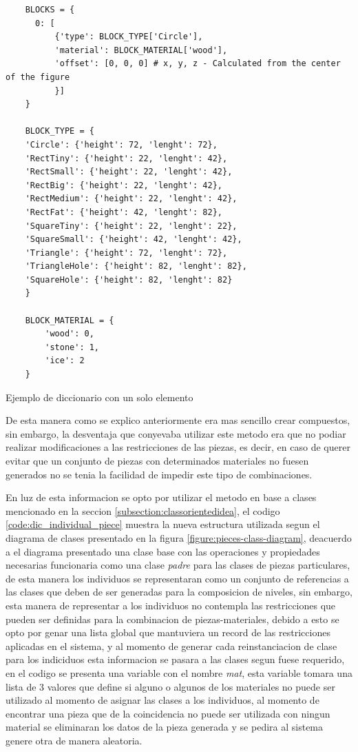 \begin{listing}[t]
  \begin{verbatim}
    BLOCKS = {
      0: [
          {'type': BLOCK_TYPE['Circle'],
          'material': BLOCK_MATERIAL['wood'],
          'offset': [0, 0, 0] # x, y, z - Calculated from the center of the figure
          }]
    }

    BLOCK_TYPE = {
    'Circle': {'height': 72, 'lenght': 72},
    'RectTiny': {'height': 22, 'lenght': 42},
    'RectSmall': {'height': 22, 'lenght': 42},
    'RectBig': {'height': 22, 'lenght': 42},
    'RectMedium': {'height': 22, 'lenght': 42},
    'RectFat': {'height': 42, 'lenght': 82},
    'SquareTiny': {'height': 22, 'lenght': 22},
    'SquareSmall': {'height': 42, 'lenght': 42},
    'Triangle': {'height': 72, 'lenght': 72},
    'TriangleHole': {'height': 82, 'lenght': 82},
    'SquareHole': {'height': 82, 'lenght': 82}
    }

    BLOCK_MATERIAL = {
        'wood': 0,
        'stone': 1,
        'ice': 2
    }
  \end{verbatim}
  \caption{Ejemplo de diccionario con un solo elemento}
  \label{code:dic_individual_piece}
\end{listing}

De esta manera como se explico anteriormente era mas sencillo crear compuestos,
sin embargo, la desventaja que conyevaba utilizar este metodo era que no podiar
realizar modificaciones a las restricciones de las piezas, es decir, en caso de
querer evitar que un conjunto de piezas con determinados materiales no fuesen
generados no se tenia la facilidad de impedir este tipo de combinaciones.

En luz de esta informacion se opto por utilizar el metodo en base a clases
mencionado en la seccion \ref{subsection:classorientedidea}, el codigo
\ref{code:dic_individual_piece} muestra la nueva estructura utilizada segun el
diagrama de clases presentado en la figura \ref{figure:pieces-class-diagram},
deacuerdo a el diagrama presentado una clase base con las operaciones y
propiedades necesarias funcionaria como una clase \textit{padre} para las clases
de piezas particulares, de esta manera los individuos se representaran como un
conjunto de referencias a las clases que deben de ser generadas para la
composicion de niveles, sin embargo, esta manera de representar a los individuos
no contempla las restricciones que pueden ser definidas para la combinacion de
piezas-materiales, debido a esto se opto por genar una lista global que
mantuviera un record de las restricciones aplicadas en el sistema, y al momento
de generar cada reinstanciacion de clase para los indiciduos esta informacion se
pasara a las clases segun fuese requerido, en el codigo se presenta una variable
con el nombre \textit{mat}, esta variable tomara una lista de 3 valores que
define si alguno o algunos de los materiales no puede ser utilizado al momento
de asignar las clases a los individuos, al momento de encontrar una pieza que de
la coincidencia no puede ser utilizada con ningun material se eliminaran los
datos de la pieza generada y se pedira al sistema genere otra de manera aleatoria.

